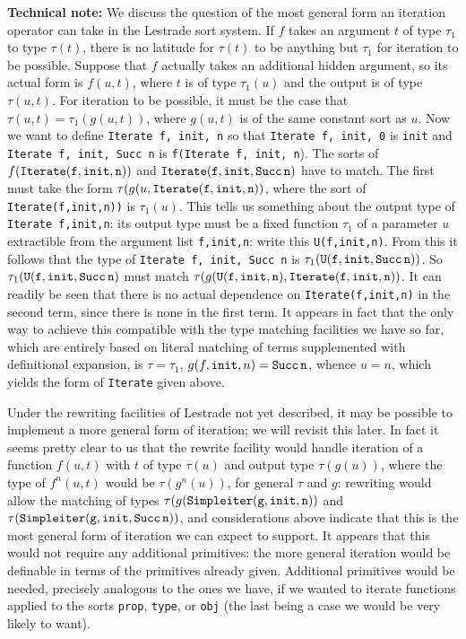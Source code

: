 \documentclass[12pt]{article}
\begin{document}
{\bf Technical note:} We discuss the question of the most general form an iteration operator can take in the Lestrade sort system.  If $f$ takes an argument $t$ of type $\tau_1$ to type $\tau(t)$,
there is no latitude for $\tau(t)$ to be anything but $\tau_1$ for iteration to be possible.  Suppose that $f$ actually takes an additional hidden argument, so its actual form
is $f(u,t)$, where $t$ is of type $\tau_1(u)$ and the output is of type $\tau(u,t)$.  For iteration to be possible, it must be the case that $\tau(u,t) = \tau_1(g(u,t))$, where
$g(u,t)$ is of the same constant sort as $u$.   Now we want to define {\tt Iterate f, init, n} so that {\tt Iterate f, init, 0} is {\tt init} and
{\tt Iterate f, init, Succ n} is {\tt f(Iterate f, init, n}).   
The sorts of $f({\tt Iterate(f,init,n)})$ and ${\tt Iterate(f,init,Succ\, n)}$ have to match.  The first must take the form
$\tau(g(u,{\tt Iterate(f,init,n)})$, where the sort of {\tt Iterate(f,init,n))} is $\tau_1(u)$.  This tells us something about the output type
of {\tt Iterate f,init,n}:  its output type must be a fixed function $\tau_1$ of a parameter $u$ extractible from the argument list {\tt f,init,n}:
write this {\tt U(f,init,n)}.  From this it follows that the type of {\tt Iterate f, init, Succ n} is $\tau_1({\tt U(f,init,Succ\, n}))$.  So $\tau_1({\tt U(f,init,Succ\, n})$ must match $\tau(g({\tt U(f,init,n)},{\tt Iterate(f,init,n)})$.  It can readily be seen that there is no actual dependence on {\tt Iterate(f,init,n)} in the second term, since there is none in the first term.
It appears in fact that the only way to achieve this compatible with the type matching facilities we have so far, which are entirely based on literal matching of terms supplemented with definitional expansion, is $\tau=\tau_1$, $g(f,{\tt init},n) = {\tt Succ\, n}$, whence $u=n$, which yields the form of {\tt Iterate} given above.

Under the rewriting facilities of Lestrade not yet described, it may be possible to implement a more general form of iteration; we will revisit this later.
In fact it seems pretty clear to us that the rewrite facility would handle iteration of a function $f(u,t)$ with $t$ of type $\tau(u)$ and output type $\tau(g(u))$, where
the type of $f^n(u,t)$ would be $\tau(g^n(u))$, for general $\tau$ and $g$:  rewriting would allow the matching of types $\tau(g({\tt Simpleiter( g,init,n}))$
and $\tau({\tt Simpleiter(g,init,Succ\, n)})$, and considerations above indicate that this is the most general form of iteration we can expect to support.  It appears that this would not require any additional primitives:  the more general iteration would be definable in terms of the primitives already given.  Additional primitives would be needed, precisely analogous to the ones we have, if we wanted to iterate functions applied to the sorts {\tt prop}, {\tt type}, or {\tt obj} (the last being a case we would be very likely to want).
\end{document}
